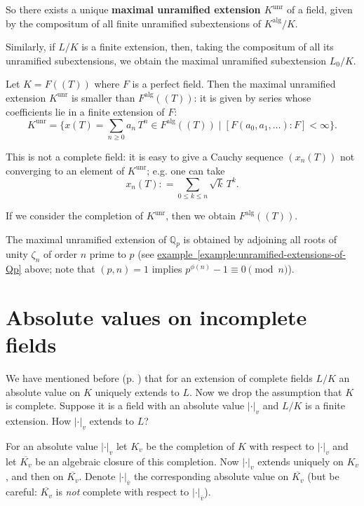 \documentclass{article}
\newcommand{\term}{\textbf}
\newcommand{\dfn}{\mathrel{\mathop:}=}
\newcommand{\QQ}{\mathbb{Q}}
\newcommand{\refref}[2]{\hyperref[#2]{#1~\ref*{#2}}}
\newcommand{\examplesymbol}{$\blacktriangle$}
\renewcommand{\qedsymbol}{$\blacksquare$}
\theoremstyle{myplain}
\theoremstyle{mydefinition}
\newenvironment{example}
  {\pushQED{\qed}\renewcommand{\qedsymbol}{\examplesymbol}\examplex}
  {\popQED\endexamplex}
\begin{document}
So there exists a unique \term{maximal unramified extension $K^\mathrm{unr}$} of
a field, given by the compositum of all finite unramified subextensions of
$K^\mathrm{alg}/K$.

Similarly, if $L/K$ is a finite extension, then, taking the compositum of all
its unramified subextensions, we obtain the maximal unramified subextension
$L_0/K$.

\begin{example}
  Let $K = F (\!(T)\!)$ where $F$ is a perfect field. Then the maximal
  unramified extension $K^\mathrm{unr}$ is smaller than
  $F^\mathrm{alg} (\!(T)\!)$: it is given by series whose coefficients lie in a
  finite extension of $F$:
  $$K^\mathrm{unr} = \{ x (T) = \sum_{n \ge 0} a_n \, T^n \in F^\mathrm{alg} (\!(T)\!) \mid [F (a_0, a_1, \ldots) : F] < \infty \}.$$

  This is not a complete field: it is easy to give a Cauchy sequence $(x_n (T))$
  not converging to an element of $K^\mathrm{unr}$; e.g. one can take
  $$x_n (T) \dfn \sum_{0 \le k \le n} \sqrt{k} \, T^k.$$

  If we consider the completion of $K^\mathrm{unr}$, then we obtain
  $F^\mathrm{alg} (\!(T)\!)$.
\end{example}

\begin{example}
  The maximal unramified extension of $\QQ_p$ is obtained by adjoining all roots
  of unity $\zeta_n$ of order $n$ prime to $p$ (see
  \refref{example}{example:unramified-extensions-of-Qp} above; note that
  $(p,n) = 1$ implies $p^{\phi (n)} - 1\equiv 0 \pmod{n}$).
\end{example}

\section{Absolute values on incomplete fields}
\label{section:absolute-values-embeddings}

We have mentioned before (p. \pageref{complete-abs-extension}) that for an
extension of complete fields $L/K$ an absolute value on $K$ uniquely extends to
$L$. Now we drop the assumption that $K$ is complete. Suppose it is a field with
an absolute value $|\cdot|_v$ and $L/K$ is a finite extension. How $|\cdot|_v$
extends to $L$?

\vspace{1em}

For an absolute value $|\cdot|_v$ let $K_v$ be the completion of $K$ with
respect to $|\cdot|_v$ and let $\overline{K_v}$ be an algebraic closure of this
completion. Now $|\cdot|_v$ extends uniquely on $K_v$, and then on
$\overline{K_v}$. Denote $|\cdot|_{\overline{v}}$ the corresponding absolute
value on $\overline{K_v}$ (but be careful: $\overline{K_v}$ is \emph{not}
complete with respect to $|\cdot|_{\overline{v}}$).
\end{document}
